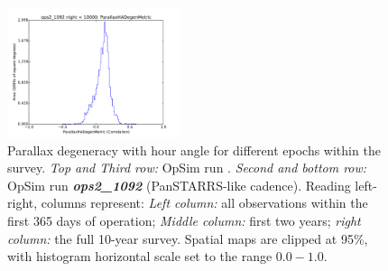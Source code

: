 \begin{figure}[ht]
\begin{center}
  \includegraphics[width=2.0in]{./figs/milkyway/MW_Astrom_paDegen_1092_10y_hst.pdf}
  \end{center}
  \caption{Parallax degeneracy with hour angle for different epochs within the survey. {\it Top and Third row:} OpSim run . {\it Second and bottom row:} OpSim run {\it \bf ops2\_1092} (PanSTARRS-like cadence). Reading left-right, columns represent: {\it Left column:} all observations within the first 365 days of operation; {\it Middle column:} first two years; {\it right column:} the full 10-year survey. Spatial maps are clipped at 95\%, with histogram horizontal scale set to the range $0.0-1.0$.}
  \label{fig_astrom_ByTime_PADegen}
\end{figure}



